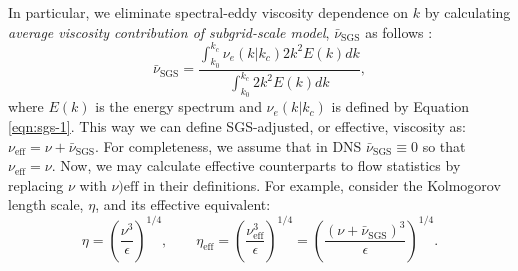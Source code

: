 \documentclass{pracamgren}
\begin{document}
In particular, we eliminate spectral-eddy viscosity dependence on $k$ by calculating \emph{average viscosity contribution of subgrid-scale model}, $\bar{\nu}_{\text{SGS}}$ as follows \parencite[Equation 13]{Jin2010}:
\begin{equation}
\bar{\nu}_{\text{SGS}} =
\frac
{\int_{k_0}^{k_c} \nu_{e}(k|k_c) 2 k^2 E(k) dk}
{\int_{k_0}^{k_c} 2 k^2 E(k) dk} ,
\label{egn:rnu-sgs}
\end{equation}
where $E(k)$ is the energy spectrum and $\nu_{e}(k|k_c)$ is defined by Equation \ref{eqn:sgs-1}.
This way we can define SGS-adjusted, or effective, viscosity as: $\nu_{\text{eff}} = \nu + \bar{\nu}_{\text{SGS}}$.
For completeness, we assume that in DNS $\bar{\nu}_{\text{SGS}} \equiv 0$ so that $\nu_{\text{eff}} = \nu$.
Now, we may calculate effective counterparts to flow statistics by replacing $\nu$ with $\nu){\text{eff}}$ in their definitions.
For example, consider the Kolmogorov length scale, $\eta$, and its effective equivalent:
$$
\eta = \left( \frac{\nu^3}{\epsilon} \right)^{1/4} , \quad \quad \eta_{\text{eff}} = \left( \frac{\nu_{\text{eff}}^3}{\epsilon} \right)^{1/4} = \left( \frac{(\nu + \bar{\nu}_{\text{SGS}})^3}{\epsilon} \right)^{1/4} .
$$
\end{document}
